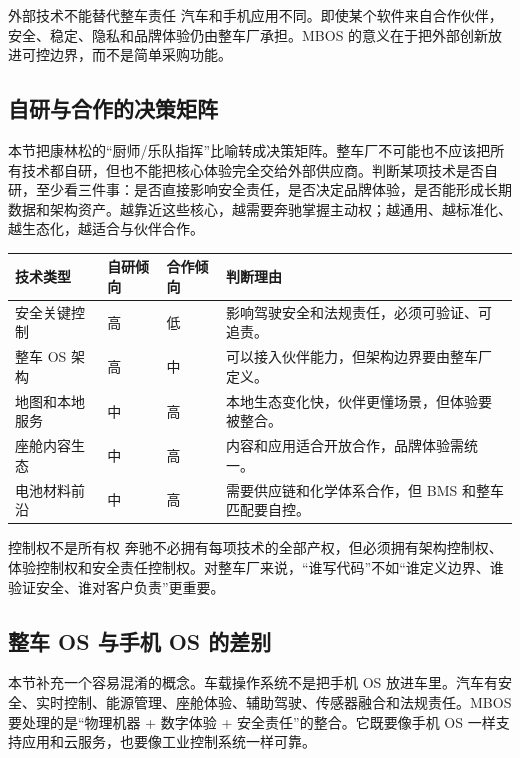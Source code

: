 \begin{warningbox}{外部技术不能替代整车责任}
汽车和手机应用不同。即使某个软件来自合作伙伴，安全、稳定、隐私和品牌体验仍由整车厂承担。MBOS 的意义在于把外部创新放进可控边界，而不是简单采购功能。
\end{warningbox}

\subsection{自研与合作的决策矩阵}

本节把康林松的“厨师/乐队指挥”比喻转成决策矩阵。整车厂不可能也不应该把所有技术都自研，但也不能把核心体验完全交给外部供应商。判断某项技术是否自研，至少看三件事：是否直接影响安全责任，是否决定品牌体验，是否能形成长期数据和架构资产。越靠近这些核心，越需要奔驰掌握主动权；越通用、越标准化、越生态化，越适合与伙伴合作。

\noindent\begin{tabularx}{\textwidth}{p{}p{}p{}X}
\toprule
技术类型 & 自研倾向 & 合作倾向 & 判断理由 \\
\midrule
安全关键控制 & 高 & 低 & 影响驾驶安全和法规责任，必须可验证、可追责。 \\
整车 OS 架构 & 高 & 中 & 可以接入伙伴能力，但架构边界要由整车厂定义。 \\
地图和本地服务 & 中 & 高 & 本地生态变化快，伙伴更懂场景，但体验要被整合。 \\
座舱内容生态 & 中 & 高 & 内容和应用适合开放合作，品牌体验需统一。 \\
电池材料前沿 & 中 & 高 & 需要供应链和化学体系合作，但 BMS 和整车匹配要自控。 \\
\bottomrule
\end{tabularx}

\begin{importantbox}{控制权不是所有权}
奔驰不必拥有每项技术的全部产权，但必须拥有架构控制权、体验控制权和安全责任控制权。对整车厂来说，“谁写代码”不如“谁定义边界、谁验证安全、谁对客户负责”更重要。
\end{importantbox}

\subsection{整车 OS 与手机 OS 的差别}

本节补充一个容易混淆的概念。车载操作系统不是把手机 OS 放进车里。汽车有安全、实时控制、能源管理、座舱体验、辅助驾驶、传感器融合和法规责任。MBOS 要处理的是“物理机器 + 数字体验 + 安全责任”的整合。它既要像手机 OS 一样支持应用和云服务，也要像工业控制系统一样可靠。


